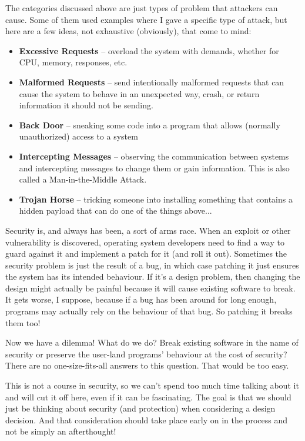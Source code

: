 The categories discussed above are just types of problem that attackers can cause. Some of them used examples where I gave a specific type of attack, but here are a few ideas, not exhaustive (obviously), that come to mind:

\begin{itemize}
	\item \textbf{Excessive Requests} -- overload the system with demands, whether for CPU, memory, responses, etc.
	\item \textbf{Malformed Requests} -- send intentionally malformed requests that can cause the system to behave in an unexpected way, crash, or return information it should not be sending.
	\item \textbf{Back Door} -- sneaking some code into a program that allows (normally unauthorized) access to a system
	\item \textbf{Intercepting Messages} -- observing the communication between systems and intercepting messages to change them or gain information. This is also called a Man-in-the-Middle Attack.
	\item \textbf{Trojan Horse} -- tricking someone into installing something that contains a hidden payload that can do one of the things above...
\end{itemize}

Security is, and always has been, a sort of arms race. When an exploit or other vulnerability is discovered, operating system developers need to find a way to guard against it and implement a patch for it (and roll it out). Sometimes the security problem is just the result of a bug, in which case patching it just ensures the system has its intended behaviour. If it's a design problem, then changing the design might actually be painful because it will cause existing software to break. It gets worse, I suppose, because if a bug has been around for long enough, programs may actually rely on the behaviour of that bug. So patching it breaks them too!

Now we have a dilemma! What do we do? Break existing software in the name of security or preserve the user-land programs' behaviour at the cost of security? There are no one-size-fits-all answers to this question. That would be too easy.

This is not a course in security, so we can't spend too much time talking about it and will cut it off here, even if it can be fascinating. The goal is that we should just be thinking about security (and protection) when considering a design decision. And that consideration should take place early on in the process and not be simply an afterthought!



